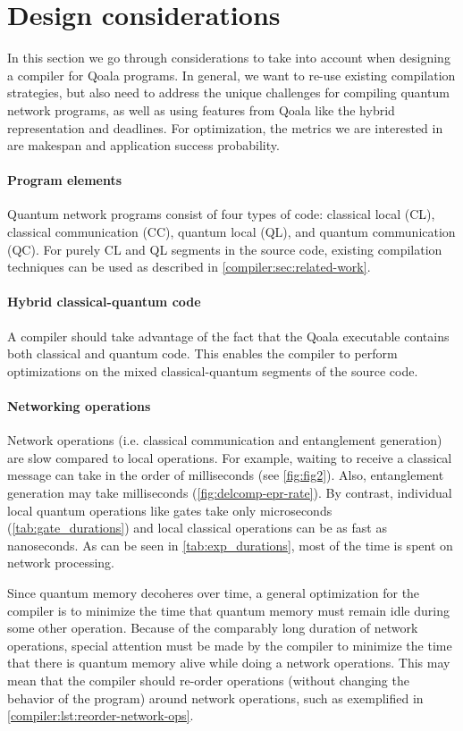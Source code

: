 \section{Design considerations}
\label{compiler:sec:design-considerations}
In this section we go through considerations to take into account when designing a compiler for Qoala programs.
In general, we want to re-use existing compilation strategies, but also need to address the unique challenges for compiling quantum network programs, as well as using features from Qoala like the hybrid representation and deadlines.
For optimization, the metrics we are interested in are makespan and application success probability.

\paragraph{Program elements}
Quantum network programs consist of four types of code: classical local (CL), classical communication (CC), quantum local (QL), and quantum communication (QC).
For purely CL and QL segments in the source code, existing compilation techniques can be used as described in \cref{compiler:sec:related-work}.

\paragraph{Hybrid classical-quantum code}
A compiler should take advantage of the fact that the Qoala executable contains both classical and quantum code.
This enables the compiler to perform optimizations on the mixed classical-quantum segments of the source code.


\paragraph{Networking operations}
Network operations (i.e. classical communication and entanglement generation) are slow compared to local operations.
For example, waiting to receive a classical message can take in the order of milliseconds (see \cref{fig:fig2}).
Also, entanglement generation may take milliseconds (\cref{fig:delcomp-epr-rate}).
By contrast, individual local quantum operations like gates take only microseconds (\cref{tab:gate_durations}) and local classical operations can be as fast as nanoseconds.
As can be seen in \cref{tab:exp_durations}, most of the time is spent on network processing.

Since quantum memory decoheres over time, a general optimization for the compiler is to minimize the time that quantum memory must remain idle during some other operation.
Because of the comparably long duration of network operations, special attention must be made by the compiler to minimize the time that there is quantum memory alive while doing a network operations.
This may mean that the compiler should re-order operations (without changing the behavior of the program) around network operations, such as exemplified in \cref{compiler:lst:reorder-network-ops}.

